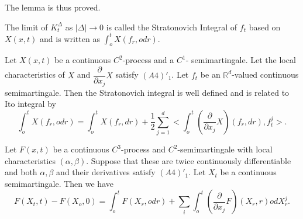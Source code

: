 The lemma is thus proved.

\setcounter{definition}{3}
\begin{definition}\label{c2:def2.7.4}%
  The limit of $K_t^{\Delta}$ as $|\Delta| \to 0$ is called the
  Stratonovich Integral of $f_t$ based on $X(x,t)$ and is written as
  $\int_o^t X(f_r, odr)$. 
\end{definition}

\setcounter{proposition}{4}
\begin{proposition}\label{c2:prop2.7.5}%
  Let $X(x, t)$ be a continuous $C^2$-process and a $C^1$-
  semimartingale. Let the local characteristics of $X$ and
  $\dfrac{\partial}{\partial x_j} X$ satisfy $(A4)'_1$. Let $f_t$ be
  an $\mathbb{R}^d$-valued continuous semimartingale. Then the Stratonovich
  integral is well defined and is related to Ito integral by  
  \begin{equation*}
    \int_o^t X(f_r, odr) = \int_o^t X(f_r, dr) + \frac{1}{2}
    \sum_{j=1}^d <\int_o^t \left(\frac{\partial}{\partial x_j} X\right) (f_r,
    dr), f_t^j>. \tag{2.7.4}\label{c2:eq2.7.4} 
  \end{equation*}
\end{proposition}

\setcounter{theorem}{5}
\begin{theorem}\label{c2:thm2.7.6}%
  Let $ F(x, t)$ be a continuous $C^3$-process and
  $C^2$-semimartingale with local characteristics $(\alpha,
  \beta)$. Suppose that these are twice continuously differentiable
  and both $\alpha, \beta$ and their derivatives satisfy
  $(A4)'_1$. Let $X_t$ be a continuous semimartingale. Then we have 
  \begin{equation*}
    F(X_t, t) - F(X_o, 0) = \int_o^t F(X_r, odr) + \sum_i \int_o^t
    \left(\frac{\partial}{\partial x_j} 
F\right) (X_r, r) odX_r^j. \tag{2.7.5}\label{c2:eq2.7.5} 
  \end{equation*}
\end{theorem}

